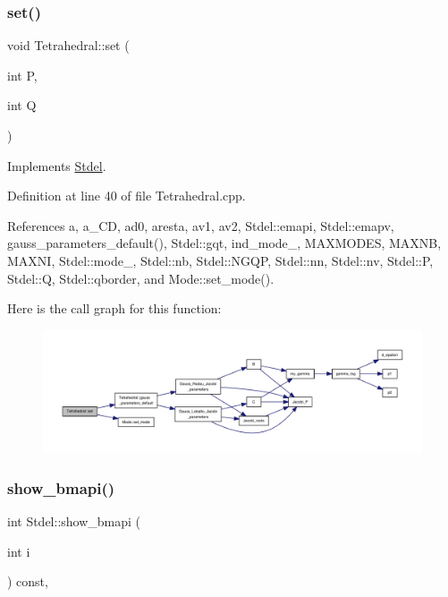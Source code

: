 \subsubsection{\texorpdfstring{set()}{set()}}
{\footnotesize\ttfamily void Tetrahedral\+::set (\begin{DoxyParamCaption}\item[{int}]{P,  }\item[{int}]{Q }\end{DoxyParamCaption})\hspace{0.3cm}{\ttfamily [virtual]}}



Implements \hyperlink{classStdel_ab42c46493ab17be6f2642a558fea8a05}{Stdel}.



Definition at line 40 of file Tetrahedral.\+cpp.



References a, a\+\_\+\+CD, ad0, aresta, av1, av2, Stdel\+::emapi, Stdel\+::emapv, gauss\+\_\+parameters\+\_\+default(), Stdel\+::gqt, ind\+\_\+mode\+\_\+, M\+A\+X\+M\+O\+D\+ES, M\+A\+X\+NB, M\+A\+X\+NI, Stdel\+::mode\+\_\+, Stdel\+::nb, Stdel\+::\+N\+G\+QP, Stdel\+::nn, Stdel\+::nv, Stdel\+::P, Stdel\+::Q, Stdel\+::qborder, and Mode\+::set\+\_\+mode().

Here is the call graph for this function\+:
\nopagebreak
\begin{figure}[H]
\begin{center}
\leavevmode
\includegraphics[width=350pt]{classTetrahedral_a05fc469d2a88e8a08a0a64621883d021_cgraph}
\end{center}
\end{figure}
\mbox{\label{classStdel_ad3a0646ad7ec2567e46da36285dee331}} 
\subsubsection{\texorpdfstring{show\+\_\+bmapi()}{show\_bmapi()}}
{\footnotesize\ttfamily int Stdel\+::show\+\_\+bmapi (\begin{DoxyParamCaption}\item[{int}]{i }\end{DoxyParamCaption}) const\hspace{0.3cm}{\ttfamily [inline]}, {\ttfamily [inherited]}}



